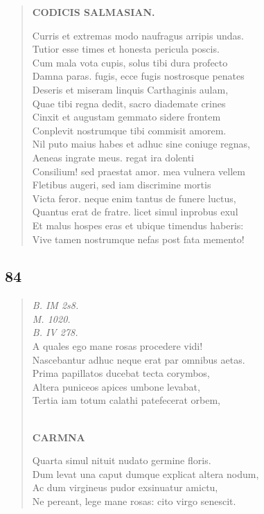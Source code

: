 \documentclass[11pt, a4paper]{report}
\begin{document}
\begin{verse}
    \begin{center} \textbf{CODICIS SALMASIAN.} \end{center} \marginpar{[119]} Curris et extremas modo naufragus arripis undas. \\ Tutior esse times et honesta pericula poscis. \\ Cum mala vota cupis, solus tibi dura profecto \\ Damna paras. fugis, ecce fugis nostrosque penates \\ Deseris et miseram linquis Carthaginis aulam, \\ Quae tibi regna dedit, sacro diademate crines \\ Cinxit et augustam gemmato sidere frontem \\ Conplevit nostrumque tibi commisit amorem. \\ Nil puto maius habes et adhuc sine coniuge regnas, \\ Aeneas ingrate meus. regat ira dolenti \\ Consilium! sed praestat amor. mea vulnera vellem \\ Fletibus augeri, sed iam discrimine mortis \\ Victa feror. neque enim tantus de funere luctus, \\ Quantus erat de fratre. licet simul inprobus exul \\ Et malus hospes eras et ubique timendus haberis: \\ Vive tamen nostrumque nefas post fata memento! \\ 
      \end{verse}
  
            \subsection*{84}
      \begin{verse}
      \textit{B. IM 2s8.} \\ \textit{M. 1020.} \\ \textit{B. IV 278.} \\  \lbrack A \rbrack  quales ego mane rosas procedere vidi! \\ Nascebantur adhuc neque erat par omnibus aetas. \\ Prima papillatos ducebat  \lbrack tecta \rbrack  corymbos, \\ Altera puniceos apices umbone levabat, \\ Tertia iam totum calathi patefecerat orbem, \\ 
        ﻿\pagebreak 
     \marginpar{[120]} \begin{center} \textbf{CARMNA} \end{center}Quarta simul nituit nudato germine floris. \\ Dum levat una caput dumque explicat altera nodum, \\ Ac dum virgineus pudor exsinuatur amictu, \\ Ne pereant, lege mane rosas:  \lbrack cito \rbrack  virgo senescit. \\ 
      \end{verse}
  
\end{document}
